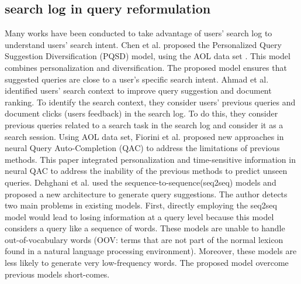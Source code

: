 \documentclass[sigconf]{acmart}
\begin{document}
\subsection{search log in query reformulation}
Many works have been conducted to take advantage of users' search log to understand users' search intent. Chen et al. \cite{chen2017personalized} proposed the Personalized Query Suggestion Diversification (PQSD) model, using the AOL data set \cite{pass2006picture}. This model combines personalization and diversification. The proposed model ensures that suggested queries are close to a user's specific search intent. Ahmad et al. \cite{ahmad2019context} identified users' search context to improve query suggestion and document ranking. To identify the search context, they consider users' previous queries and document clicks (users feedback) in the search log. To do this, they consider previous queries related to a search task in the search log and consider it as a search session. Using AOL data set, Fiorini et al. \cite{fiorini2018personalized} proposed new approaches in neural Query Auto-Completion (QAC) to address the limitations of previous methods. This paper integrated personalization and time-sensitive information in neural QAC to address the inability of the previous methods to predict unseen queries. Dehghani et al. \cite{dehghani2017learning} used the sequence-to-sequence(seq2seq) models and proposed a new architecture to generate query suggestions. The author detects two main problems in existing models. First, directly employing the seq2seq model would lead to losing information at a query level because this model considers a query like a sequence of words. These models are unable to handle out-of-vocabulary words (OOV: terms that are not part of the normal lexicon found in a natural language processing environment). Moreover, these models are less likely to generate very low-frequency words. The proposed model overcome previous models short-comes.
\vspace{-3pt}
\end{document}

